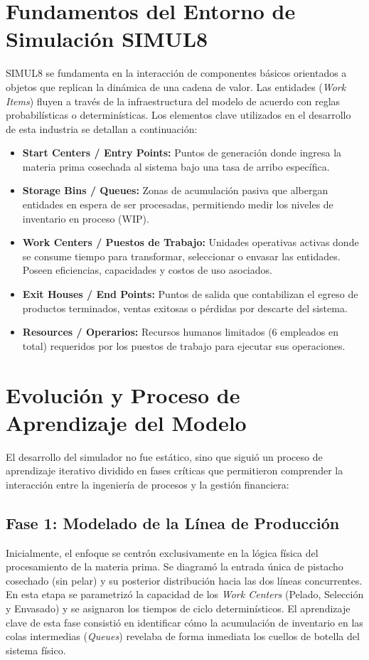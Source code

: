 \documentclass{llncs}
\begin{document}
\section{Fundamentos del Entorno de Simulación SIMUL8}
SIMUL8 se fundamenta en la interacción de componentes básicos orientados a objetos que replican la dinámica de una cadena de valor. Las entidades (\textit{Work Items}) fluyen a través de la infraestructura del modelo de acuerdo con reglas probabilísticas o determinísticas. Los elementos clave utilizados en el desarrollo de esta industria se detallan a continuación:
\begin{itemize}
    \item \textbf{Start Centers / Entry Points:} Puntos de generación donde ingresa la materia prima cosechada al sistema bajo una tasa de arribo específica.
    \item \textbf{Storage Bins / Queues:} Zonas de acumulación pasiva que albergan entidades en espera de ser procesadas, permitiendo medir los niveles de inventario en proceso (WIP).
    \item \textbf{Work Centers / Puestos de Trabajo:} Unidades operativas activas donde se consume tiempo para transformar, seleccionar o envasar las entidades. Poseen eficiencias, capacidades y costos de uso asociados.
    \item \textbf{Exit Houses / End Points:} Puntos de salida que contabilizan el egreso de productos terminados, ventas exitosas o pérdidas por descarte del sistema.
    \item \textbf{Resources / Operarios:} Recursos humanos limitados (6 empleados en total) requeridos por los puestos de trabajo para ejecutar sus operaciones.
\end{itemize}

\section{Evolución y Proceso de Aprendizaje del Modelo}
El desarrollo del simulador no fue estático, sino que siguió un proceso de aprendizaje iterativo dividido en fases críticas que permitieron comprender la interacción entre la ingeniería de procesos y la gestión financiera:

\subsection{Fase 1: Modelado de la Línea de Producción}
Inicialmente, el enfoque se centrón exclusivamente en la lógica física del procesamiento de la materia prima. Se diagramó la entrada única de pistacho cosechado (sin pelar) y su posterior distribución hacia las dos líneas concurrentes. En esta etapa se parametrizó la capacidad de los \textit{Work Centers} (Pelado, Selección y Envasado) y se asignaron los tiempos de ciclo determinísticos. El aprendizaje clave de esta fase consistió en identificar cómo la acumulación de inventario en las colas intermedias (\textit{Queues}) revelaba de forma inmediata los cuellos de botella del sistema físico.
\end{document}
